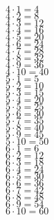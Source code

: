 \documentclass{article}
\begin{document}
\begin{multicols}{3}
\noindent
$4 \cdot 1 = 4$ \\
$4 \cdot 2 = 8$ \\
$4 \cdot 3 = 12$ \\
$4 \cdot 4 = 16$ \\
$4 \cdot 5 = 20$ \\
$4 \cdot 6 = 24$ \\
$4 \cdot 7 = 28$ \\
$4 \cdot 8 = 32$ \\
$4 \cdot 9 = 36$ \\
$4 \cdot 10= 40$ \\

\noindent
$5 \cdot 1 = 5$ \\
$5 \cdot 2 = 10$ \\
$5 \cdot 3 = 15$ \\
$5 \cdot 4 = 20$ \\
$5 \cdot 5 = 25$ \\
$5 \cdot 6 = 30$ \\
$5 \cdot 7 = 35$ \\
$5 \cdot 8 = 40$ \\
$5 \cdot 9 = 45$ \\
$5 \cdot 10 = 50$ \\

\noindent
$6 \cdot 1 = 6$ \\
$6 \cdot 2 = 12$ \\
$6 \cdot 3 = 18$ \\
$6 \cdot 4 = 24$ \\
$6 \cdot 5 = 30$ \\
$6 \cdot 6 = 36$ \\
$6 \cdot 7 = 42$ \\
$6 \cdot 8 = 48$ \\
$6 \cdot 9 = 54$ \\
$6 \cdot 10 = 60$ \\
\end{multicols}
\end{document}

